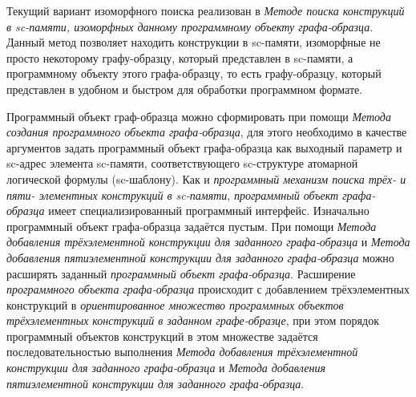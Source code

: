 Текущий вариант изоморфного поиска реализован в \textit{Методе поиска конструкций в sc-памяти, изоморфных данному программному объекту графа-образца}. Данный метод позволяет находить конструкции в sc-памяти, изоморфные не просто некоторому графу-образцу, который представлен в sc-памяти, а программному объекту этого графа-образцу, то есть графу-образцу, который представлен в удобном и быстром для обработки программном формате. 

Программный объект граф-образца можно сформировать при помощи \textit{Метода создания программного объекта графа-образца}, для этого необходимо в качестве аргументов задать программный объект графа-образца как выходный параметр и sc-адрес элемента sc-памяти, соответствующего sc-структуре атомарной логической формулы (sc-шаблону).
Как и \textit{программный механизм поиска трёх- и пяти- элементных конструкций в sc-памяти}, \textit{программный объект графа-образца} имеет специализированный программный интерфейс. Изначально программный объект графа-образца задаётся пустым. При помощи \textit{Метода добавления трёхэлементной конструкции для заданного графа-образца} и \textit{Метода добавления пятиэлементной конструкции для заданного графа-образца} можно расширять заданный \textit{программный объект графа-образца}. Расширение \textit{программного объекта графа-образца} происходит с добавлением трёхэлементных конструкций в \textit{ориентированное множество программных объектов трёхэлементных конструкций в заданном графе-образце}, при этом порядок программный объектов конструкций в этом множестве задаётся последовательностью выполнения \textit{Метода добавления трёхэлементной конструкции для заданного графа-образца} и \textit{Метода добавления пятиэлементной конструкции для заданного графа-образца}.

